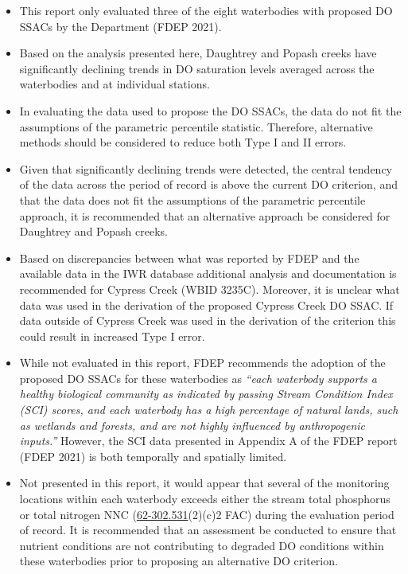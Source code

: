 \documentclass[]{interact}
\theoremstyle{plain}%
\theoremstyle{definition}
\theoremstyle{remark}
\begin{document}
\begin{itemize}
\item
  This report only evaluated three of the eight waterbodies with
  proposed DO SSACs by the Department (FDEP 2021).
\item
  Based on the analysis presented here, Daughtrey and Popash creeks have
  significantly declining trends in DO saturation levels averaged across
  the waterbodies and at individual stations.
\item
  In evaluating the data used to propose the DO SSACs, the data do not
  fit the assumptions of the parametric percentile statistic. Therefore,
  alternative methods should be considered to reduce both Type I and II
  errors.
\item
  Given that significantly declining trends were detected, the central
  tendency of the data across the period of record is above the current
  DO criterion, and that the data does not fit the assumptions of the
  parametric percentile approach, it is recommended that an alternative
  approach be considered for Daughtrey and Popash creeks.
\item
  Based on discrepancies between what was reported by FDEP and the
  available data in the IWR database additional analysis and
  documentation is recommended for Cypress Creek (WBID 3235C). Moreover,
  it is unclear what data was used in the derivation of the proposed
  Cypress Creek DO SSAC. If data outside of Cypress Creek was used in
  the derivation of the criterion this could result in increased Type I
  error.
\item
  While not evaluated in this report, FDEP recommends the adoption of
  the proposed DO SSACs for these waterbodies as \emph{``each waterbody
  supports a healthy biological community as indicated by passing Stream
  Condition Index (SCI) scores, and each waterbody has a high percentage
  of natural lands, such as wetlands and forests, and are not highly
  influenced by anthropogenic inputs.''} However, the SCI data presented
  in Appendix A of the FDEP report (FDEP 2021) is both temporally and
  spatially limited.
\item
  Not presented in this report, it would appear that several of the
  monitoring locations within each waterbody exceeds either the stream
  total phosphorus or total nitrogen NNC
  (\href{https://www.flrules.org/gateway/ruleno.asp?id=62-302.531}{62-302.531}(2)(c)2
  FAC) during the evaluation period of record. It is recommended that an
  assessment be conducted to ensure that nutrient conditions are not
  contributing to degraded DO conditions within these waterbodies prior
  to proposing an alternative DO criterion.
\end{itemize}
\end{document}
